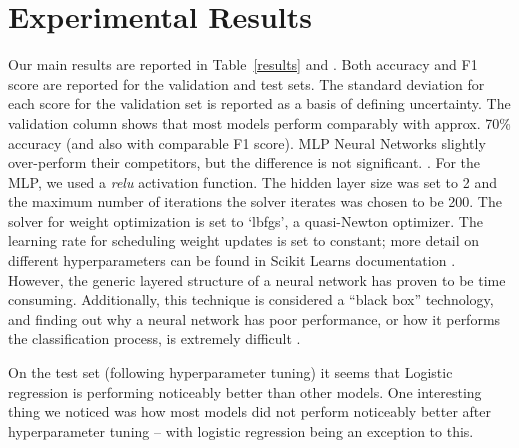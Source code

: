 \section{Experimental Results} \label{experresults}
Our main results are reported in Table~\ref{results} and .
Both accuracy and F1 score are reported for the validation and test sets. The standard deviation for each score for the validation set is reported as a basis of defining uncertainty. The validation column shows that most models perform comparably with approx. 70\% accuracy (and also with comparable F1 score). MLP Neural Networks slightly over-perform their competitors, but the difference is not significant.
.
For the MLP, we used a  \textit{relu} activation function.
The hidden layer size was set to 2 and the maximum number of iterations the solver iterates was chosen to be 200. The solver for weight optimization is set to `lbfgs', a quasi-Newton optimizer. The learning rate for scheduling weight updates is set to constant; more detail on different hyperparameters can be found in Scikit Learns documentation \cite{pedregosa2011scikit}. However, the generic layered structure of a neural network has proven to be time consuming. Additionally, this technique is considered a ``black box'' technology, and finding out why a neural network has poor performance, or how it performs the classification process, is extremely difficult \cite{noriega2005multilayer}.

On the test set (following hyperparameter tuning) it seems that Logistic regression is performing noticeably better than other models. One interesting thing we noticed was how most models did not perform noticeably better after hyperparameter tuning -- with logistic regression being an exception to this.

